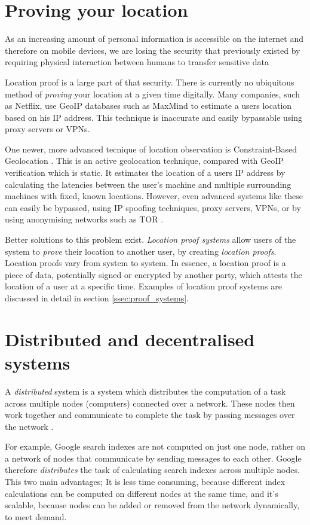 \section{Proving your location}
As an increasing amount of personal information is accessible on the internet and therefore on mobile devices, we are losing the security that previously existed by requiring physical interaction between humans to transfer sensitive data

Location proof is a large part of that security. There is currently no ubiquitous method of \textit{proving} your location at a given time digitally. Many companies, such as Netflix, use GeoIP databases such as MaxMind \cite{maxmind} to estimate a users location based on his IP address. This technique is inaccurate and easily bypassable using proxy servers or VPNs.

One newer, more advanced tecnique of location observation is Constraint-Based Geolocation \cite{constraint-based}. This is an active geolocation technique, compared with GeoIP verification which is static. It estimates the location of a users IP address by calculating the latencies between the user's machine and multiple surrounding machines with fixed, known locations. However, even advanced systems like these can easily be bypassed, using IP spoofing techniques, proxy servers, VPNs, or by using anonymising networks such as TOR \cite{tor}.

Better solutions to this problem exist. \textit{Location proof systems} allow users of the system to \textit{prove} their location to another user, by creating \textit{location proofs}. Location proofs vary from system to system. In essence, a location proof is a piece of data, potentially signed or encrypted by another party, which attests the location of a user at a specific time. Examples of location proof systems are discussed in detail in section \ref{ssec:proof_systems}.

\section{Distributed and decentralised systems}
A \textit{distributed} system is a system which distributes the computation of a task across multiple nodes (computers) connected over a network. These nodes then work together and communicate to complete the task by passing messages over the network \cite{distributed}.

For example, Google search indexes are not computed on just one node, rather on a network of nodes that communicate by sending messages to each other. Google therefore \textit{distributes} the task of calculating search indexes across multiple nodes. This two main advantages; It is less time consuming, because different index calculations can be computed on different nodes at the same time, and it's scalable, because nodes can be added or removed from the network dynamically, to meet demand.

